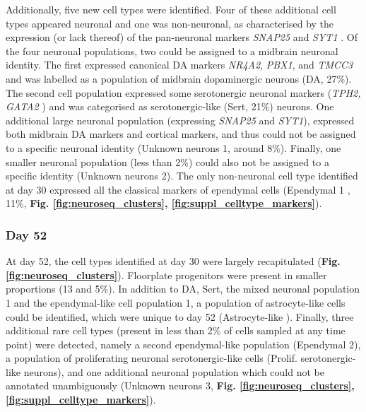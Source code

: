 Additionally, five new cell types were identified.
Four of these additional cell types appeared neuronal and one was non-neuronal, as characterised by the expression (or lack thereof) of the pan-neuronal markers \textit{SNAP25} and \textit{SYT1} \cite{arenas2015make}.
Of the four neuronal populations, two could be assigned to a midbrain neuronal identity.
The first expressed canonical DA markers \textit{NR4A2}, \textit{PBX1}, and \textit{TMCC3} \cite{la2016molecular, park2006acquisition, ramonet2012park9} and was labelled as a population of midbrain dopaminergic neurons (DA, 27\%).
The second cell population expressed some serotonergic neuronal markers (\textit{TPH2, GATA2} \cite{cummings2019serotonergic}) and was categorised as serotonergic-like (Sert, 21\%) neurons. 
One additional large neuronal population (expressing \textit{SNAP25} and \textit{SYT1}), expressed both midbrain DA markers and cortical markers,
and thus could not be assigned to a specific neuronal identity (Unknown neurons 1, around 8\%).
Finally, one smaller neuronal population (less than 2\%) could also not be assigned to a specific identity (Unknown neurons 2). 
The only non-neuronal cell type identified at day 30 expressed all the classical markers of ependymal cells (Ependymal 1 \cite{campbell2017molecular}, 11\%,\textbf{ Fig. \ref{fig:neuroseq_clusters}, \ref{fig:suppl_celltype_markers}}). 

\subsubsection{Day 52}

At day 52, the cell types identified at day 30 were largely recapitulated (\textbf{Fig. \ref{fig:neuroseq_clusters}}).
Floorplate progenitors were present in smaller proportions (13 and 5\%).
In addition to DA, Sert, the mixed neuronal population 1 and the ependymal-like cell population 1, a population of astrocyte-like cells could be identified, which were unique to day 52 (Astrocyte-like \cite{sloan2017human, zhang2016purification}). 
Finally, three additional rare cell types (present in less than 2\% of cells sampled at any time point) were detected, namely a second ependymal-like population (Ependymal 2), a population of proliferating neuronal serotonergic-like cells (Prolif. serotonergic-like neurons), and one additional neuronal population which could not be annotated unambiguously (Unknown neurons 3, \textbf{Fig. \ref{fig:neuroseq_clusters}, \ref{fig:suppl_celltype_markers}}). \\

